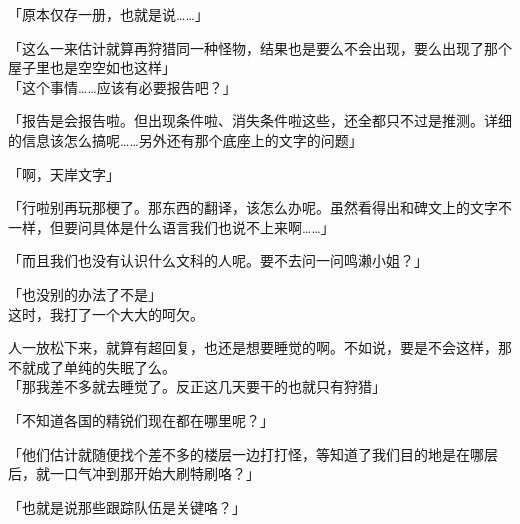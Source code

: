 「原本仅存一册，也就是说……」

「这么一来估计就算再狩猎同一种怪物，结果也是要么不会出现，要么出现了那个屋子里也是空空如也这样」\\

「这个事情……应该有必要报告吧？」

「报告是会报告啦。但出现条件啦、消失条件啦这些，还全都只不过是推测。详细的信息该怎么搞呢……另外还有那个底座上的文字的问题」

「啊，天岸文字」

「行啦别再玩那梗了。那东西的翻译，该怎么办呢。虽然看得出和碑文上的文字不一样，但要问具体是什么语言我们也说不上来啊……」

「而且我们也没有认识什么文科的人呢。要不去问一问鸣濑小姐？」

「也没别的办法了不是」\\

这时，我打了一个大大的呵欠。

人一放松下来，就算有超回复，也还是想要睡觉的啊。不如说，要是不会这样，那不就成了单纯的失眠了么。\\

「那我差不多就去睡觉了。反正这几天要干的也就只有狩猎」

「不知道各国的精锐们现在都在哪里呢？」

「他们估计就随便找个差不多的楼层一边打打怪，等知道了我们目的地是在哪层后，就一口气冲到那开始大刷特刷咯？」

「也就是说那些跟踪队伍是关键咯？」

